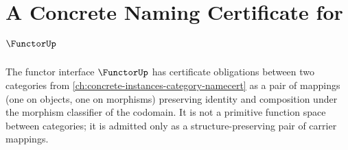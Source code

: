 \chapter{A Concrete Naming Certificate for \(\FunctorUp\)}
\label{ch:concrete-instances-functor-namecert}

The functor interface \(\FunctorUp\) has certificate obligations between two categories from \autoref{ch:concrete-instances-category-namecert} as a pair of mappings (one on objects, one on morphisms) preserving identity and composition under the morphism classifier of the codomain. It is not a primitive function space between categories; it is admitted only as a structure-preserving pair of carrier mappings.









